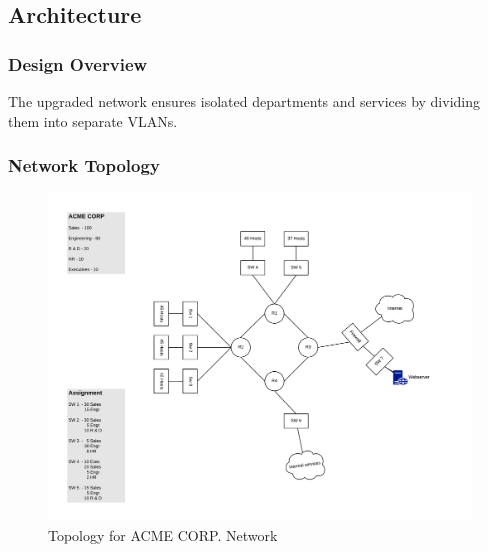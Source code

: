 \subsection{Architecture}
\subsubsection{Design Overview}
The upgraded network ensures isolated departments and services by dividing 
them into separate VLANs.
\subsubsection{Network Topology}
\begin{figure}[!htb]
	\includegraphics[width=\textwidth]{images/networktopology.png}
	\caption{Topology for ACME CORP. Network}
\end{figure}
